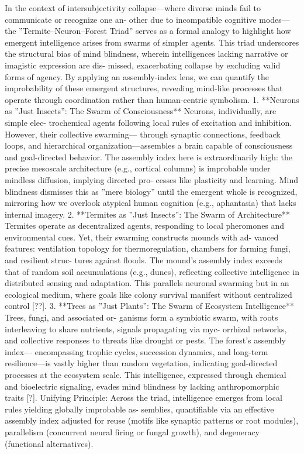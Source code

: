 \documentclass{article}
\begin{document}
In the context of intersubjectivity collapse—where diverse minds fail to communicate or recognize one an-
other due to incompatible cognitive modes—the ”Termite–Neuron–Forest Triad” serves as a formal analogy
to highlight how emergent intelligence arises from swarms of simpler agents. This triad underscores the
structural bias of mind blindness, wherein intelligences lacking narrative or imagistic expression are dis-
missed, exacerbating collapse by excluding valid forms of agency.
By applying an assembly-index lens,
we can quantify the improbability of these emergent structures, revealing mind-like processes that operate
through coordination rather than human-centric symbolism.
1. **Neurons as ”Just Insects”: The Swarm of Consciousness** Neurons, individually, are simple elec-
trochemical agents following local rules of excitation and inhibition. However, their collective swarming—
through synaptic connections, feedback loops, and hierarchical organization—assembles a brain capable
of consciousness and goal-directed behavior. The assembly index here is extraordinarily high: the precise
mesoscale architecture (e.g., cortical columns) is improbable under mindless diffusion, implying directed pro-
cesses like plasticity and learning. Mind blindness dismisses this as ”mere biology” until the emergent whole
is recognized, mirroring how we overlook atypical human cognition (e.g., aphantasia) that lacks internal
imagery.
2. **Termites as ”Just Insects”: The Swarm of Architecture** Termites operate as decentralized agents,
responding to local pheromones and environmental cues. Yet, their swarming constructs mounds with ad-
vanced features: ventilation topology for thermoregulation, chambers for farming fungi, and resilient struc-
tures against floods. The mound’s assembly index exceeds that of random soil accumulations (e.g., dunes),
reflecting collective intelligence in distributed sensing and adaptation. This parallels neuronal swarming but
in an ecological medium, where goals like colony survival manifest without centralized control [??].
3. **Trees as ”Just Plants”: The Swarm of Ecosystem Intelligence** Trees, fungi, and associated or-
ganisms form a symbiotic swarm, with roots interleaving to share nutrients, signals propagating via myc-
orrhizal networks, and collective responses to threats like drought or pests. The forest’s assembly index—
encompassing trophic cycles, succession dynamics, and long-term resilience—is vastly higher than random
vegetation, indicating goal-directed processes at the ecosystem scale. This intelligence, expressed through
chemical and bioelectric signaling, evades mind blindness by lacking anthropomorphic traits [?].
Unifying Principle: Across the triad, intelligence emerges from local rules yielding globally improbable as-
semblies, quantifiable via an effective assembly index adjusted for reuse (motifs like synaptic patterns or root
modules), parallelism (concurrent neural firing or fungal growth), and degeneracy (functional alternatives).
\end{document}
